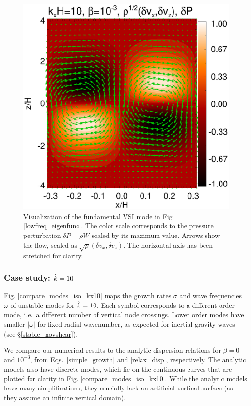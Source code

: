 \begin{figure}
  \includegraphics[width=\linewidth]{figures/result2d_iso}
  \caption{Visualization of the fundamental VSI mode in
    Fig. \ref{lowfreq_eigenfunc}. The color scale corresponds to the
    pressure perturbation $\delta P=\rho W$ scaled by its maximum value.
    Arrows show the flow, scaled as $\sqrt{\rho}(\delta
    v_x,\delta v_z)$. The horizontal axis has been stretched 
    for clarity.  
    \label{lowfreq_eigenfunc_2d}
  }
\end{figure}

\subsubsection{Case study: $\hat{k}=10$}\label{k10}
Fig. \ref{compare_modes_iso_kx10} maps the growth rates $\sigma$ and
wave frequencies $\omega$ of unstable 
modes for $\hat{k}=10$.  Each symbol 
corresponds to a different order mode, i.e.\ a different number of vertical node crossings.  Lower order modes
have smaller $|\omega|$ for fixed radial wavenumber, as expected for
inertial-gravity waves (see \S\ref{stable_novshear}).  

We compare our numerical results to the analytic dispersion relations for 
$\beta = 0$ and $10^{-3}$, from Eqs.\ \ref{simple_growth} and
\ref{relax_disp}, respectively.   The analytic models also have
discrete modes, which lie on the continuous curves that are plotted
for clarity in Fig. \ref{compare_modes_iso_kx10}.   While the analytic
models have many simplifications, they crucially lack an artificial
vertical surface (as they assume an infinite vertical domain).   

